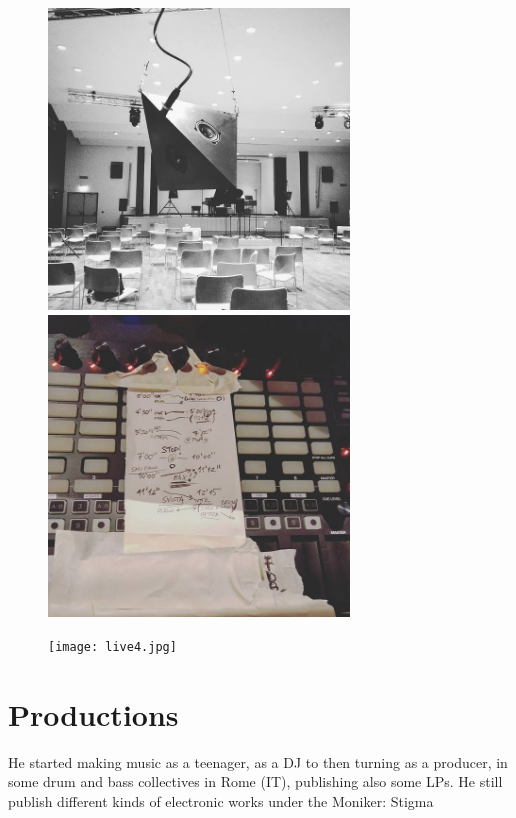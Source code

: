 \documentclass[12pt,landscape]{article}
\begin{document}
{\begin{center}
\begin{figure}[!htb]
\endminipage\hfill
{}
  \includegraphics[width=8cm]{live2.jpg}

\endminipage\hfill
{}%
  \includegraphics[width=8cm]{live3.jpg}

\endminipage\hfill
{}%
  \texttt{[image: live4.jpg]}

\endminipage
\end{figure}

\clearpage


\section*{Productions}

He started making music as a teenager,
as a DJ to then turning as a producer,
\newline
in some drum and bass collectives in Rome (IT),
publishing also some LPs.
He still publish different kinds of electronic
works under the Moniker: Stigma


\end{center}}
\end{document}
